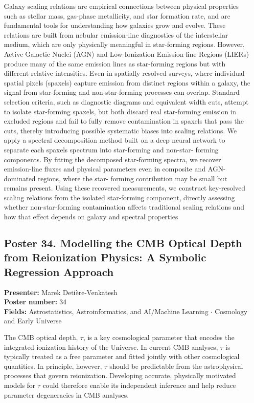 Galaxy scaling relations are empirical connections between physical properties such as stellar mass, gas-phase metallicity, and star formation rate, and are fundamental tools for understanding how galaxies grow and evolve. These relations are built from nebular emission-line diagnostics of the interstellar medium, which are only physically meaningful in star-forming regions. However, Active Galactic Nuclei (AGN) and Low-Ionization Emission-line Regions (LIERs) produce many of the same emission lines as star-forming regions but with different relative intensities. Even in spatially resolved surveys, where individual spatial pixels (spaxels) capture emission from distinct regions within a galaxy, the signal from star-forming and non-star-forming processes can overlap. Standard selection criteria, such as diagnostic diagrams and equivalent width cuts, attempt to isolate star-forming spaxels, but both discard real star-forming emission in excluded regions and fail to fully remove contamination in spaxels that pass the cuts, thereby introducing possible systematic biases into scaling relations. We apply a spectral decomposition method built on a deep neural network to separate each spaxels spectrum into star-forming and non-star- forming components. By fitting the decomposed star-forming spectra, we recover emission-line fluxes and physical parameters even in composite and AGN-dominated regions, where the star- forming contribution may be small but remains present. Using these recovered measurements, we construct key-resolved scaling relations from the isolated star-forming component, directly assessing whether non-star-forming contamination affects traditional scaling relations and how that effect depends on galaxy and spectral properties

\hypertarget{poster-abstract-talk-162}{}\label{poster-abstract-page-talk-162}
\subsection*{Poster 34. Modelling the CMB Optical Depth from Reionization Physics: A Symbolic Regression Approach}
\textbf{Presenter:} Marek Detière-Venkatesh\\
\textbf{Poster number:} 34\\
\textbf{Fields:} Astrostatistics, Astroinformatics, and AI/Machine Learning $\cdot$ Cosmology and Early Universe

The CMB optical depth, $\tau$, is a key cosmological parameter that encodes the integrated ionization history of the Universe. In current CMB analyses, $\tau$ is typically treated as a free parameter and fitted jointly with other cosmological quantities. In principle, however, $\tau$ should be predictable from the astrophysical processes that govern reionization. Developing accurate, physically motivated models for $\tau$ could therefore enable its independent inference and help reduce parameter degeneracies in CMB analyses.

